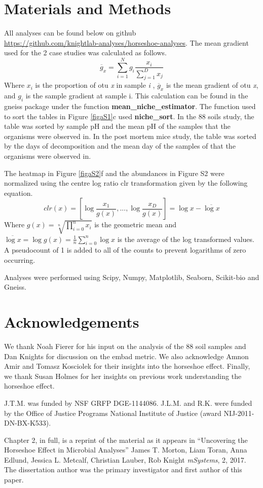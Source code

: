 \section{Materials and Methods}
All analyses can be found below on github \\
\url{https://github.com/knightlab-analyses/horseshoe-analyses}.
The mean gradient used for the 2 case studies was calculated as follows.
\begin{equation}
        \overline{g}_{x}=\sum_{i=1}^{N}g_{i}\frac{x_{i}}{\sum_{j=1}^{D}x_{j}}
\end{equation}
Where $x_{i}$ is the proportion of \gls{otu} \textit{x} in sample \textit{i} , $\overline{g}_{x}$ is the mean gradient of \gls{otu} \textit{x}, and $g_{i}$  is the sample gradient at sample i. This calculation can be found in the gneiss package under the function \textbf{mean\_niche\_estimator}. The function used to sort the tables in Figure \ref{figaS1}c used \textbf{niche\_sort}. In the 88 soils study, the table was sorted by sample pH and the mean pH of the samples that the organisms were observed in. In the post mortem mice study, the table was sorted by the days of decomposition and the mean day of the samples of that the organisms were observed in.\par
The heatmap in Figure \ref{figaS2}f and the abundances in Figure S2 were normalized using the centre log ratio \gls{clr} transformation given by the following equation.
\begin{equation}
        clr(x)=\left [ \log \frac{x_{1}}{g(x)},...,\log \frac{x_{D}}{g(x)} \right ]=\log x-\overline{\log x}
\end{equation}
Where $g(x)=\sqrt[n]{\prod_{i=0}^{n}x_{i}}$ is the geometric mean and $\overline{\log x}=\log g(x)=\frac{1}{n}\sum_{i=0}^{n}\log x$ is the average of the log transformed values.  A pseudocount of 1 is added to all of the counts to prevent logarithms of zero occurring. \par
Analyses were performed using Scipy, Numpy, Matplotlib, Seaborn, Scikit-bio and Gneiss.
\section{Acknowledgements}
We thank Noah Fierer for his input on the analysis of the 88 soil samples and Dan Knights for discussion on the \gls{embad} metric. We also acknowledge Amnon Amir and Tomasz Kosciolek for their insights into the horseshoe effect. Finally, we thank Susan Holmes for her insights on previous work understanding the horseshoe effect.

J.T.M. was funded by NSF GRFP DGE-1144086. J.L.M. and R.K. were funded by the Office of Justice Programs National Institute of Justice (award NIJ-2011-DN-BX-K533).

Chapter 2, in full, is a reprint of the material as it appears in
``Uncovering the Horseshoe Effect in Microbial Analyses''
James T. Morton, Liam Toran, Anna Edlund, Jessica L. Metcalf,
Christian Lauber, Rob Knight \emph{mSystems}, 2, 2017.  The dissertation author was the primary investigator and first author of this paper.

